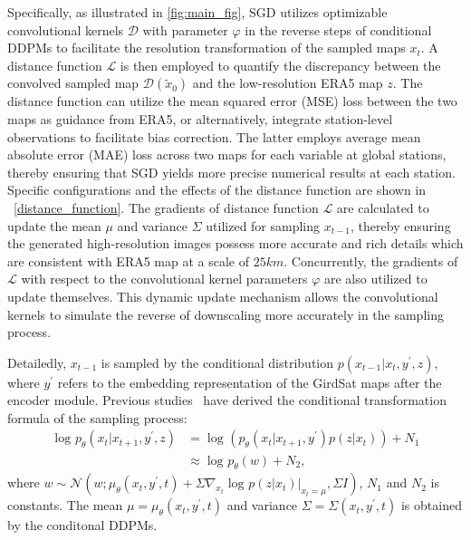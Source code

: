 Specifically, as illustrated in \cref{fig:main_fig}, SGD utilizes optimizable convolutional kernels $\mathcal{D}$ with parameter $\varphi$ in the reverse steps of conditional DDPMs to facilitate the resolution transformation of the sampled maps $x_t$.
A distance function $\mathcal{L}$ is then employed to quantify the discrepancy between the convolved sampled map $\mathcal{D}(\tilde{x}_0)$ and the low-resolution ERA5 map $z$. 
The distance function can utilize the mean squared error (MSE) loss between the two maps as guidance from ERA5, or alternatively, integrate station-level observations to facilitate bias correction. 
The latter employs average mean absolute error (MAE) loss across two maps for each variable at global stations, thereby ensuring that SGD yields more precise numerical results at each station. 
Specific configurations and the effects of the distance function are shown in ~\cref{distance_function}. 
The gradients of distance function $\mathcal{L}$ are calculated to update the mean $\mu$ and variance $\Sigma$ utilized for sampling $x_{t-1}$, thereby ensuring the generated high-resolution images possess more accurate and rich details which are consistent with ERA5 map at a scale of $25km$. 
Concurrently, the gradients of $\mathcal{L}$ with respect to the convolutional kernel parameters $\varphi$ are also utilized to update themselves. 
This dynamic update mechanism allows the convolutional kernels to simulate the reverse of downscaling more accurately in the sampling process. 

Detailedly, $x_{t-1}$ is sampled by the conditional distribution $p(x_{t-1}|x_{t},y^\prime,z)$, where $y^\prime$ refers to the embedding representation of the GirdSat maps after the encoder module. 
Previous studies~\citep{dhariwal2021diffusion} have derived the conditional transformation formula of the sampling process: 
\begin{align}
\log_{}{p_\theta(x_{t}|x_{t+1},y^\prime,z)}&=\log_{}{(p_\theta(x_{t}|x_{t+1},y^\prime)p(z|x_{t})) }+N_1 \\
&\approx \log_{}{p_\theta(w)+N_2},
\end{align}
where $w\sim \mathcal{N}(w;\mu_\theta(x_t,y^\prime,t)+\Sigma \nabla_{x_t}\log_{}{p(z|x_t)}|_{x_t=\mu},\Sigma I)$, $N_1$ and $N_2$ is constants. The mean $\mu=\mu_\theta(x_t,y^\prime,t)$ and variance $\Sigma=\Sigma(x_t,y^\prime,t)$ is obtained by the conditonal DDPMs. 

